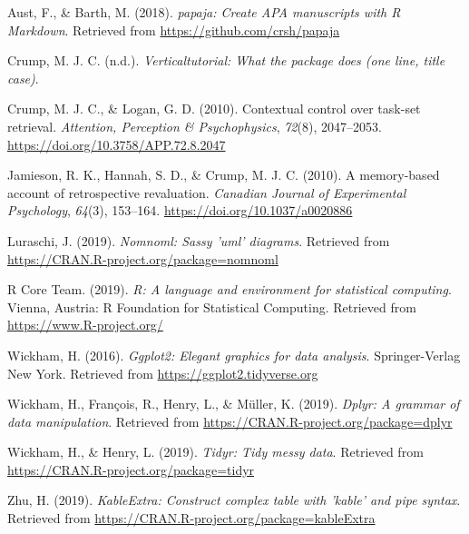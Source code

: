 \documentclass[
  english,
  man,floatsintext]{apa6}
\newlength{\cslhangindent}
\newenvironment{cslreferences}%
  {\setlength{\parindent}{0pt}%
  \everypar{\setlength{\hangindent}{\cslhangindent}}\ignorespaces}%
  {\par}
\begin{document}
\hypertarget{refs}{}
\begin{cslreferences}
\leavevmode\hypertarget{ref-R-papaja}{}%
Aust, F., \& Barth, M. (2018). \emph{papaja: Create APA manuscripts with R Markdown}. Retrieved from \url{https://github.com/crsh/papaja}

\leavevmode\hypertarget{ref-R-verticaltutorial}{}%
Crump, M. J. C. (n.d.). \emph{Verticaltutorial: What the package does (one line, title case)}.

\leavevmode\hypertarget{ref-crumpContextualControlTaskset2010}{}%
Crump, M. J. C., \& Logan, G. D. (2010). Contextual control over task-set retrieval. \emph{Attention, Perception \& Psychophysics}, \emph{72}(8), 2047--2053. \url{https://doi.org/10.3758/APP.72.8.2047}

\leavevmode\hypertarget{ref-jamiesonMemorybasedAccountRetrospective2010}{}%
Jamieson, R. K., Hannah, S. D., \& Crump, M. J. C. (2010). A memory-based account of retrospective revaluation. \emph{Canadian Journal of Experimental Psychology}, \emph{64}(3), 153--164. \url{https://doi.org/10.1037/a0020886}

\leavevmode\hypertarget{ref-R-nomnoml}{}%
Luraschi, J. (2019). \emph{Nomnoml: Sassy 'uml' diagrams}. Retrieved from \url{https://CRAN.R-project.org/package=nomnoml}

\leavevmode\hypertarget{ref-R-base}{}%
R Core Team. (2019). \emph{R: A language and environment for statistical computing}. Vienna, Austria: R Foundation for Statistical Computing. Retrieved from \url{https://www.R-project.org/}

\leavevmode\hypertarget{ref-R-ggplot2}{}%
Wickham, H. (2016). \emph{Ggplot2: Elegant graphics for data analysis}. Springer-Verlag New York. Retrieved from \url{https://ggplot2.tidyverse.org}

\leavevmode\hypertarget{ref-R-dplyr}{}%
Wickham, H., François, R., Henry, L., \& Müller, K. (2019). \emph{Dplyr: A grammar of data manipulation}. Retrieved from \url{https://CRAN.R-project.org/package=dplyr}

\leavevmode\hypertarget{ref-R-tidyr}{}%
Wickham, H., \& Henry, L. (2019). \emph{Tidyr: Tidy messy data}. Retrieved from \url{https://CRAN.R-project.org/package=tidyr}

\leavevmode\hypertarget{ref-R-kableExtra}{}%
Zhu, H. (2019). \emph{KableExtra: Construct complex table with 'kable' and pipe syntax}. Retrieved from \url{https://CRAN.R-project.org/package=kableExtra}
\end{cslreferences}

\endgroup
\end{document}

